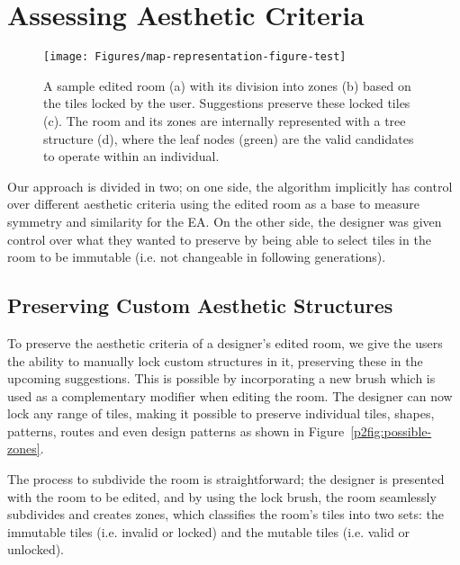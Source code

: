 \section{Assessing Aesthetic Criteria} \label{p2approach}

\begin{figure}
\texttt{[image: Figures/map-representation-figure-test]}
\caption{A sample edited room (a) with its division into zones (b) based on the tiles locked by the user. Suggestions preserve these locked tiles (c). The room and its zones are internally represented with a tree structure (d), where the leaf nodes (green) are the valid candidates to operate within an individual.}
\label{p2fig:map-representation}
\end{figure}

Our approach is divided in two; on one side, the algorithm implicitly has control over different aesthetic criteria using the edited room as a base to measure symmetry and similarity for the EA. On the other side, the designer was given control over what they wanted to preserve by being able to select tiles in the room to be immutable (i.e. not changeable in following generations).

\subsection{Preserving Custom Aesthetic Structures}

To preserve the aesthetic criteria of a designer's edited room, we give the users the ability to manually lock custom structures in it, preserving these in the upcoming suggestions. This is possible by incorporating a new brush which is used as a complementary modifier when editing the room. The designer can now lock any range of tiles, making it possible to preserve individual tiles, shapes, patterns, routes and even design patterns as shown in Figure~\ref{p2fig:possible-zones}.

The process to subdivide the room is straightforward; the designer is presented with the room to be edited, and by using the lock brush, the room seamlessly subdivides and creates zones, which classifies the room's tiles into two sets: the immutable tiles (i.e. invalid or locked) and the mutable tiles (i.e. valid or unlocked).

